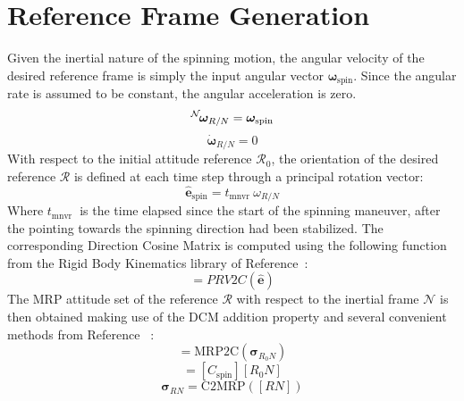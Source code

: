 \documentclass[]{AVSSimReportMemo}
\begin{document}
\section{Reference Frame Generation}
Given the inertial nature of the spinning motion, the angular velocity of the desired reference frame is simply the input angular vector $\bm{\omega}_{\textrm{spin}}$. Since the angular rate is assumed to be constant, the angular acceleration is zero.
\begin{equation}
	\leftexp{N} {\bm{\omega}_{R/N}} = \bm{\omega}_{\textrm{spin}}
\end{equation}
\begin{equation}
	 \dot{\bm{\omega}}_{R/N} = 0
\end{equation}
With respect to the initial attitude reference $\mathcal{R}_0$, the orientation of the desired reference $\mathcal{R}$ is defined at each time step through a principal rotation vector:
\begin{equation}
	\hat{\bm{e}}_{\textrm{spin}} = t_{\textrm{mnvr }} \omega_{R/N}
\end{equation}
Where $ t_{\textrm{mnvr }}$ is the time elapsed since the start of the spinning maneuver, after the pointing towards the spinning direction had been stabilized.
The corresponding Direction Cosine Matrix is computed using the following function from the Rigid Body Kinematics library of Reference~:
\begin{equation}
	[C_{\textrm{spin}}] = PRV2C(\hat{\bm{e}})
\end{equation}
The MRP attitude set of the reference $\mathcal{R}$ with respect to the inertial frame $\mathcal{N}$ is then obtained making use of the DCM addition property and several convenient methods from Reference ~:
\begin{equation}
	[R_{0}N] = \textrm{MRP2C}( \bm{\sigma}_{R_{0}N})
\end{equation}
\begin{equation}
	[RN] = [C_{\textrm{spin}}][R_{0}N]
\end{equation}
\begin{equation}
	\bm{\sigma}_{RN} =  \textrm{C2MRP}([RN])
\end{equation}



\end{document}
